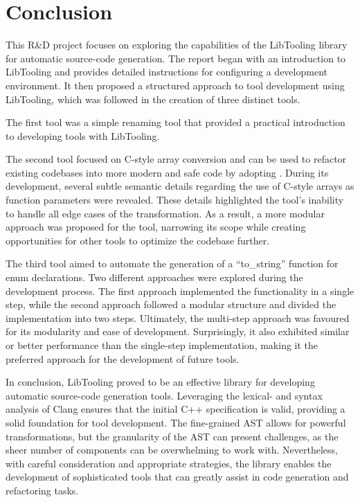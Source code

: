 \chapter{Conclusion}
This R\&D project focuses on exploring the capabilities of the LibTooling library for automatic source-code generation.
The report began with an introduction to LibTooling and provides detailed instructions for configuring a development environment.
It then proposed a structured approach to tool development using LibTooling, which was followed in the creation of three distinct tools.

The first tool was a simple renaming tool that provided a practical introduction to developing tools with LibTooling.

The second tool focused on C-style array conversion and can be used to refactor existing codebases into more modern and safe code by adopting .
During its development, several subtle semantic details regarding the use of C-style arrays as function parameters were revealed.
These details highlighted the tool's inability to handle all edge cases of the transformation.
As a result, a more modular approach was proposed for the tool, narrowing its scope while creating opportunities for other tools to optimize the codebase further.

The third tool aimed to automate the generation of a ``to\_string'' function for enum declarations.
Two different approaches were explored during the development process.
The first approach implemented the functionality in a single step, while the second approach followed a modular structure and divided the implementation into two steps.
Ultimately, the multi-step approach was favoured for its modularity and ease of development.
Surprisingly, it also exhibited similar or better performance than the single-step implementation, making it the preferred approach for the development of future tools.


In conclusion, LibTooling proved to be an effective library for developing automatic source-code generation tools.
Leveraging the lexical- and syntax analysis of Clang ensures that the initial C++ specification is valid, providing a solid foundation for tool development.
The fine-grained AST  allows for powerful transformations, but the granularity of the AST can present challenges, as the sheer number of components can be overwhelming to work with.
Nevertheless, with careful consideration and appropriate strategies, the library enables the development of sophisticated tools that can greatly assist in code generation and refactoring tasks.